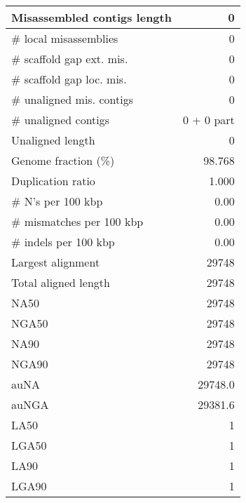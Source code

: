 \documentclass[12pt,a4paper]{article}
\begin{document}
\begin{table}[ht]
\begin{center}
\begin{tabular}{|l*{1}{|r}|}
Misassembled contigs length & 0 \\ \hline
\# local misassemblies & 0 \\ \hline
\# scaffold gap ext. mis. & 0 \\ \hline
\# scaffold gap loc. mis. & 0 \\ \hline
\# unaligned mis. contigs & 0 \\ \hline
\# unaligned contigs & 0 + 0 part \\ \hline
Unaligned length & 0 \\ \hline
Genome fraction (\%) & 98.768 \\ \hline
Duplication ratio & 1.000 \\ \hline
\# N's per 100 kbp & 0.00 \\ \hline
\# mismatches per 100 kbp & 0.00 \\ \hline
\# indels per 100 kbp & 0.00 \\ \hline
Largest alignment & 29748 \\ \hline
Total aligned length & 29748 \\ \hline
NA50 & 29748 \\ \hline
NGA50 & 29748 \\ \hline
NA90 & 29748 \\ \hline
NGA90 & 29748 \\ \hline
auNA & 29748.0 \\ \hline
auNGA & 29381.6 \\ \hline
LA50 & 1 \\ \hline
LGA50 & 1 \\ \hline
LA90 & 1 \\ \hline
LGA90 & 1 \\ \hline
\end{tabular}
\end{center}
\end{table}
\end{document}
